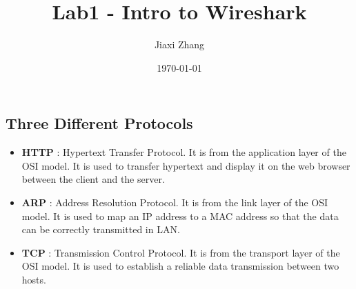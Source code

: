\documentclass{article}
\title{Lab1 - Intro to Wireshark}
\author{Jiaxi Zhang}
\date{\today}
\begin{document}
\maketitle
\begin{CJK*}{UTF8}{gbsn}

\section{Three Different Protocols}
\begin{itemize}
    \item \textbf{HTTP} : Hypertext Transfer Protocol. It is from the application layer of the OSI model. It is used
    to transfer hypertext and display it on the web browser between the client and the server.
    \item \textbf{ARP} : Address Resolution Protocol. It is from the link layer of the OSI model. It is used to map
    an IP address to a MAC address so that the data can be correctly transmitted in LAN.
    \item \textbf{TCP} : Transmission Control Protocol. It is from the transport layer of the OSI model. It is used
    to establish a reliable data transmission between two hosts.
\end{itemize}


\end{CJK*}
\end{document}
